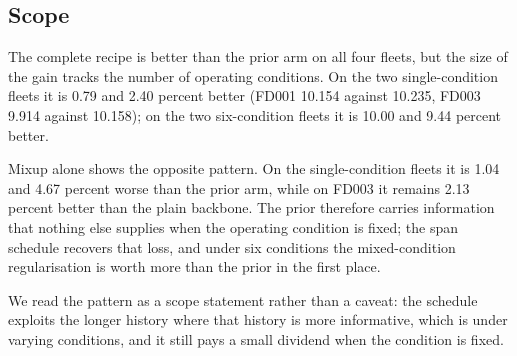 \subsection{Scope}

The complete recipe is better than the prior arm on all four fleets, but the size of the gain tracks the number of operating conditions. On the two single-condition fleets it is 0.79 and 2.40 percent better (FD001 10.154 against 10.235, FD003 9.914 against 10.158); on the two six-condition fleets it is 10.00 and 9.44 percent better.

Mixup alone shows the opposite pattern. On the single-condition fleets it is 1.04 and 4.67 percent worse than the prior arm, while on FD003 it remains 2.13 percent better than the plain backbone. The prior therefore carries information that nothing else supplies when the operating condition is fixed; the span schedule recovers that loss, and under six conditions the mixed-condition regularisation is worth more than the prior in the first place.

We read the pattern as a scope statement rather than a caveat: the schedule exploits the longer history where that history is more informative, which is under varying conditions, and it still pays a small dividend when the condition is fixed.
